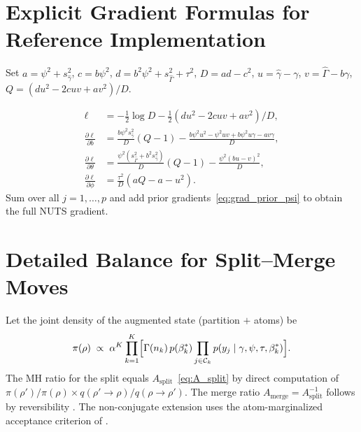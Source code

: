 \documentclass[12pt, a4paper]{article}
\theoremstyle{remark}
\begin{document}
\section{Explicit Gradient Formulas for Reference Implementation}
\label{app:gradients}

Set $a = \psi^2 + s^2_{\hat\gamma}$, $c = b\psi^2$,
$d = b^2\psi^2 + s^2_{\hat\Gamma} + \tau^2$, $D = ad - c^2$,
$u = \hat\gamma - \gamma$, $v = \hat\Gamma - b\gamma$,
$Q = (du^2 - 2cuv + av^2)/D$.

\begin{align}
\ell &= -\tfrac{1}{2}\log D
        - \tfrac{1}{2}(du^2 - 2cuv + av^2)/D,
        \label{app:lik}\\[4pt]
\frac{\partial\ell}{\partial b}
  &= \frac{b\psi^2 s^2_{\hat\gamma}}{D}(Q - 1)
     - \frac{b\psi^2 u^2 - \psi^2 uv + b\psi^2 u\gamma - av\gamma}{D},
     \label{app:grad_b}\\[4pt]
\frac{\partial\ell}{\partial\theta}
  &= \frac{\psi^2(s^2_{\hat\Gamma}+b^2 s^2_{\hat\gamma})}{D}(Q - 1)
     - \frac{\psi^2(bu - v)^2}{D},
     \label{app:grad_theta}\\[4pt]
\frac{\partial\ell}{\partial\phi}
  &= \frac{\tau^2}{D}(aQ - a - u^2).
     \label{app:grad_phi}
\end{align}
Sum over all $j = 1,\ldots,p$ and add prior
gradients~\eqref{eq:grad_prior_psi} to obtain the full NUTS gradient.

\section{Detailed Balance for Split--Merge Moves}
\label{app:sm_balance}

Let the joint density of the augmented state (partition $+$ atoms) be
\begin{equation}
  \pi(\rho) \;\propto\; \alpha^K \prod_{k=1}^K
  \Bigl[\Gamma(n_k)\,p(\beta_k^*)
  \prod_{j\in\mathcal{C}_k}
  p(y_j \mid \gamma,\psi,\tau,\beta_k^*)\Bigr].
\end{equation}
The MH ratio for the split equals
$A_{\mathrm{split}}$~\eqref{eq:A_split}
by direct computation of
$\pi(\rho')/\pi(\rho) \times q(\rho'\to\rho)/q(\rho\to\rho')$.
The merge ratio $A_{\mathrm{merge}} = A_{\mathrm{split}}^{-1}$
follows by reversibility \cite{Jain2004}.
The non-conjugate extension uses the atom-marginalized acceptance
criterion of \cite{Jain2007}.
\end{document}
